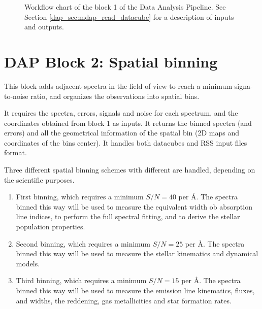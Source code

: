 \documentclass[11pt]{book}
\begin{document}
\begin{figure}
\begin{center}
\caption{Workflow chart of the block 1 of the Data Analysis
  Pipeline. See Section \ref{dap_sec:mdap_read_datacube} for a
  description of inputs and outputs.}
 \label{dap_fig:block1}
\end{center}
\end{figure}





\section[DAP Block 2: Spatial binning]{DAP Block 2: Spatial binning}
\label{dap_sec:block2}

This block adds adjacent spectra in the field of view to reach a
minimum signa-to-noise ratio, and organizes the observations into
spatial bins. 

It requires the spectra, errors, signals and noise for each spectrum,
and the coordinates obtained from block 1 as inputs. It returns the
binned spectra (and errors) and all the geometrical information of the
spatial bin (2D maps and coordinates of the bins center). It handles
both datacubes and RSS input files format.

Three different spatial binning schemes with different
are handled, depending on the scientific purposes.


\begin{enumerate}

\item First binning, which requires a minimum $S/N = 40$ per
  \AA. The spectra binned this way will be used to measure the
  equivalent width ob absorption line indices, to perform the full
  spectral fitting, and to derive the stellar population properties.

\item Second binning, which requires a minimum $S/N = 25$ per
  \AA. The spectra binned this way will be used to measure the
  stellar kinematics and dynamical models.


\item Third binning, which requires a minimum $S/N = 15$ per
  \AA. The spectra binned this way will be used to measure the
  emission line kinematics, fluxes, and widths, the reddening, gas
  metallicities and star formation rates.

\end{enumerate}
\end{document}
